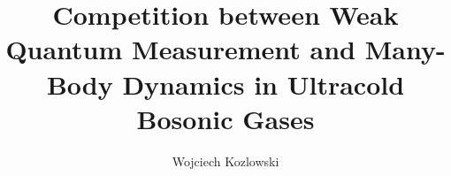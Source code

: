 \title{Competition between Weak Quantum Measurement and Many-Body
Dynamics in Ultracold Bosonic Gases}


\author{Wojciech Kozlowski}












